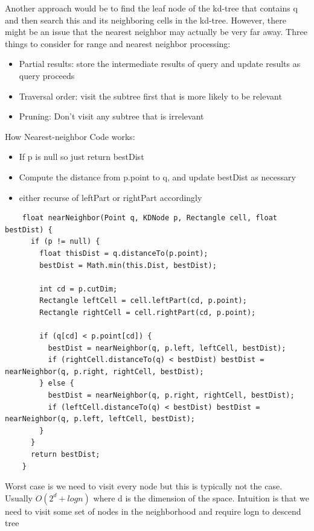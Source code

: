 \documentclass{article}
\begin{document}
  Another approach would be to find the leaf node of the kd-tree that contains q and then search this and its neighboring cells in the kd-tree. However, there might be an issue that the nearest neighbor may actually be very far away. 
  Three things to consider for range and nearest neighbor processing:
  \begin{itemize}[noitemsep]
    \item Partial results: store the intermediate results of query and update results as query proceeds
    \item Traversal order: visit the subtree first that is more likely to be relevant
    \item Pruning: Don't visit any subtree that is irrelevant
  \end{itemize}
  How Nearest-neighbor Code works:
  \begin{itemize}[noitemsep]
    \item If p is null so just return bestDist
    \item Compute the distance from p.point to q, and update bestDist as necessary
    \item either recurse of leftPart or rightPart accordingly
  \end{itemize}
  \newpage
  \begin{lstlisting}
    float nearNeighbor(Point q, KDNode p, Rectangle cell, float bestDist) {
      if (p != null) {
        float thisDist = q.distanceTo(p.point);
        bestDist = Math.min(this.Dist, bestDist);

        int cd = p.cutDim;
        Rectangle leftCell = cell.leftPart(cd, p.point);
        Rectangle rightCell = cell.rightPart(cd, p.point);

        if (q[cd] < p.point[cd]) {
          bestDist = nearNeighbor(q, p.left, leftCell, bestDist);
          if (rightCell.distanceTo(q) < bestDist) bestDist = nearNeighbor(q, p.right, rightCell, bestDist);
        } else {
          bestDist = nearNeighbor(q, p.right, rightCell, bestDist);
          if (leftCell.distanceTo(q) < bestDist) bestDist = nearNeighbor(q, p.left, leftCell, bestDist);
        }
      }
      return bestDist;
    }
  \end{lstlisting}
  Worst case is we need to visit every node but this is typically not the case. Usually $O(2^{d} + logn)$ where d is the dimension of the space. Intuition is that we need to visit some set of nodes in the neighborhood and require logn to descend tree
  \newpage
\end{document}
